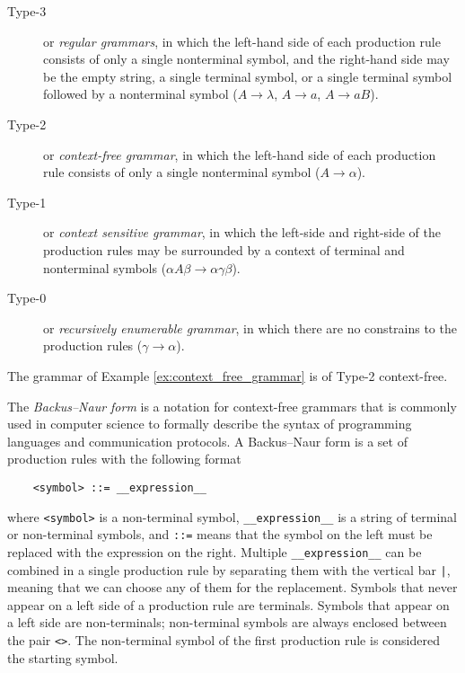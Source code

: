 \begin{description}
\item[Type-3] or \emph{regular grammars}, in which the left-hand side of each production rule consists of only a single nonterminal symbol, and the right-hand side may be the empty string, a single terminal symbol, or a single terminal symbol followed by a nonterminal symbol ($A \rightarrow \lambda$, $A \rightarrow a$, $A \rightarrow aB$).

\item[Type-2] or \emph{context-free grammar}, in which the left-hand side of each production rule consists of only a single nonterminal symbol ($A \rightarrow \alpha$). 

\item[Type-1] or \emph{context sensitive grammar}, in which the left-side and right-side of the production rules may be surrounded by a context of terminal and nonterminal symbols ($\alpha A \beta \rightarrow \alpha \gamma \beta$).

\item[Type-0] or \emph{recursively enumerable grammar}, in which there are no constrains to the production rules ($\gamma \rightarrow \alpha$).
\end{description}

\begin{example}
The grammar of Example \ref{ex:context_free_grammar} is of Type-2 context-free.
\end{example}

The \emph{Backus–Naur form} is a notation for context-free grammars that is commonly used in computer science to formally describe the syntax of programming languages and communication protocols. A Backus–Naur form is a set of production rules with the following format

\begin{verbatim}
    <symbol> ::= __expression__
\end{verbatim}

where \texttt{<symbol>} is a non-terminal symbol, \texttt{\_\_expression\_\_} is a string of terminal or non-terminal symbols, and \texttt{::=} means that the symbol on the left must be replaced with the expression on the right. Multiple  \texttt{\_\_expression\_\_} can be combined in a single production rule by separating them with the vertical bar \texttt{|}, meaning that we can choose any of them for the replacement. Symbols that never appear on a left side of a production rule are terminals. Symbols that appear on a left side are non-terminals; non-terminal symbols are always enclosed between the pair \texttt{<>}. The non-terminal symbol of the first production rule is considered the starting symbol.

